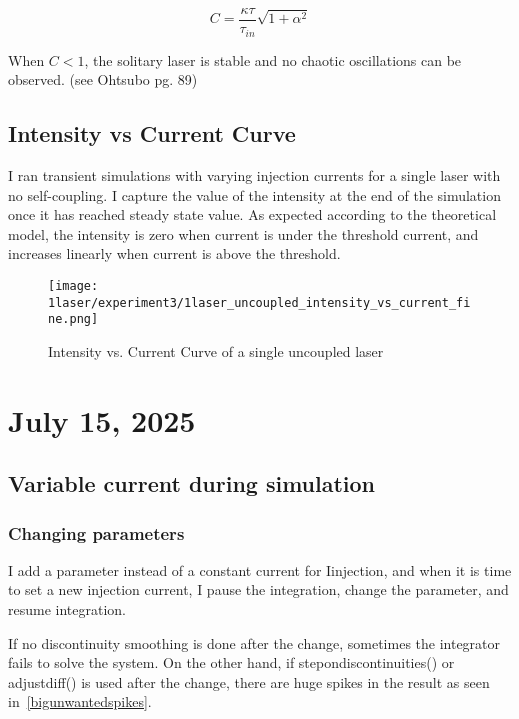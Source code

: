 \documentclass[11pt,letterpaper]{article}
\begin{document}
\begin{equation}
C = \frac{\kappa \tau}{\tau_{in}} \sqrt{1 + \alpha^2}
\end{equation}

When $C < 1$, the solitary laser is stable and no chaotic oscillations can be observed. (see Ohtsubo pg. 89)

\subsection{Intensity vs Current Curve}

I ran transient simulations with varying injection currents for a single laser with no self-coupling. I capture the value of the intensity at the end of the simulation once it has reached steady state value. As expected according to the theoretical model, the intensity is zero when current is under the threshold current, and increases linearly when current is above the threshold.

\begin{figure}[H]
\centering
\texttt{[image: 1laser/experiment3/1laser\_uncoupled\_intensity\_vs\_current\_fine.png]}
\caption{Intensity vs. Current Curve of a single uncoupled laser\label{intensitycurveuncoupled}}
\end{figure}

\section{July 15, 2025}

\subsection{Variable current during simulation}
\subsubsection{Changing parameters}
I add a parameter instead of a constant current for I\textunderscore injection, and when it is time to set a new injection current, I pause the integration, change the parameter, and resume integration.

If no discontinuity smoothing is done after the change, sometimes the integrator fails to solve the system. On the other hand, if step\textunderscore on\textunderscore discontinuities() or adjust\textunderscore diff() is used after the change, there are huge spikes in the result as seen in~\ref{bigunwantedspikes}.
\end{document}
